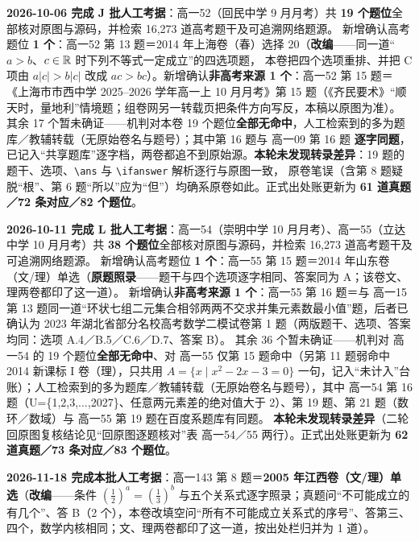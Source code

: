 \documentclass[a4paper,11pt]{article}
\begin{document}
\textbf{2026-10-06 完成 J 批人工考据}：高一52（回民中学 9 月月考）共 \textbf{19 个题位}全部核对原图与源码，并检索 16,273 道高考题干及可追溯网络题源。
新增确认高考题位 \textbf{1 个}：高一52 第 13 题＝2014 年上海卷（春）选择 20（\textbf{改编}------同一道``\(a>b\)、\(c\in\mathbb{R}\) 时下列不等式一定成立''的四选项题，
本卷把四个选项重排、并把 C 项由 \(a\lvert c\rvert>b\lvert c\rvert\) 改成 \(ac>bc\)）。新增确认\textbf{非高考来源 1 个}：高一52 第 15 题＝
《上海市市西中学 2025--2026 学年高一上 10 月月考》第 15 题（《齐民要术》``顺天时，量地利''情境题；组卷网另一转载页把条件方向写反，本稿以原图为准）。
其余 17 个暂未确证------机判对本卷 19 个题位\textbf{全部无命中}，人工检索到的多为题库／教辅转载（无原始卷名与题号）；其中第 16 题与 高一09 第 16 题
\textbf{逐字同题}，已记入``共享题库''逐字档，两卷都追不到原始源。\textbf{本轮未发现转录差异}：19 题的题干、选项、\texttt{\textbackslash{}ans} 与 \texttt{\textbackslash{}ifanswer} 解析逐行与原图一致，
原卷笔误（含第 8 题疑脱``根''、第 6 题``所以''应为``但''）均确系原卷如此。正式出处账更新为 \textbf{61 道真题／72 条对应／82 个题位}。

\textbf{2026-10-11 完成 L 批人工考据}：高一54（崇明中学 10 月月考）、高一55（立达中学 10 月月考）共 \textbf{38 个题位}全部核对原图与源码，并检索 16,273 道高考题干及可追溯网络题源。
新增确认高考题位 \textbf{1 个}：高一55 第 15 题＝2014 年山东卷（文/理）单选（\textbf{原题照录}------题干与四个选项逐字相同、答案同为 A；该卷文、理两卷都印了这一道）。
新增确认\textbf{非高考来源 1 个}：高一55 第 16 题＝与 高一15 第 13 题同一道``环状七组二元集合相邻两两不交求并集元素数最小值''题，后者已确认为 2023 年湖北省部分名校高考数学二模试卷第 1 题（两版题干、选项、答案均同：选项 A.4／B.5／C.6／D.7、答案 B）。
其余 36 个暂未确证------机判对 高一54 的 19 个题位\textbf{全部无命中}、对 高一55 仅第 15 题命中（另第 11 题弱命中 2014 新课标 I 卷（理），只共用 \(A=\{x\mid x^2-2x-3=0\}\) 一句，记入``未计入''台账）；人工检索到的多为题库／教辅转载（无原始卷名与题号），其中 高一54 第 16 题（U=\{1,2,3,...,2027\}、任意两元素差的绝对值大于 2）、第 19 题、第 21 题（数环／数域）与 高一55 第 19 题在百度系题库有同题。
\textbf{本轮未发现转录差异}（二轮回原图复核结论见``回原图逐题核对''表 高一54／55 两行）。正式出处账更新为 \textbf{62 道真题／73 条对应／83 个题位}。

\textbf{2026-11-18 完成本批人工考据}：高一143 第 8 题＝\textbf{2005 年江西卷（文/理）单选}（\textbf{改编}------条件 \((\frac12)^a=(\frac13)^b\) 与五个关系式逐字照录；真题问``不可能成立的有几个''、答 B（2 个），本卷改填空问``所有不可能成立关系式的序号''、答第三、四个，数学内核相同；文、理两卷都印了这一道，按出处栏归并为 1 道）。
\end{document}
